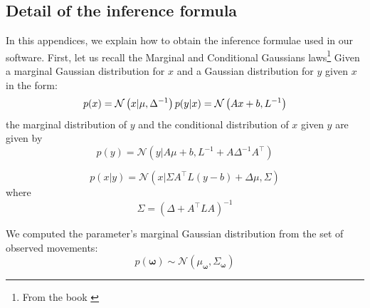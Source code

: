 \documentclass[utf8]{frontiersSCNS} %
\begin{document}





\begin{appendices}
\section{Detail of the inference formula}
\label{sec:formulas}

In this appendices, we explain how to obtain the inference formulae used in our software.
First, let us recall the Marginal and Conditional Gaussians laws\footnote{\label{noteGaussian} From the book \cite{bishop2006pattern}}
Given a marginal Gaussian distribution for $x$ and a Gaussian distribution for $y$ given $x$ in the form:
\begin{equation}
\label{eq:book1}
p(x) = \mathcal{N}\left(x | \mu, \Delta^{-1}\right)\\
p(y|x) = \mathcal{N}\left(Ax + b, L^{-1}\right)
\end{equation}
the marginal distribution of $y$ and the conditional distribution of $x$ given $y$ are given by
\begin{equation}
\label{eq:book2}
p(y) = \mathcal{N}\left(y | A\mu + b, L^{-1} + A\Delta^{-1}A^\top\right) 
\end{equation}

\begin{equation}
\label{eq:book3}
p(x | y) = \mathcal{N}\left(x | \Sigma{ A^\top L(y-b) + \Delta\mu},\Sigma\right)
\end{equation}
where
$$\Sigma = (\Delta + A^\top LA)^{-1}$$

We computed the parameter's marginal Gaussian distribution from the set of observed movements:
\begin{equation}
\label{paramdistrib}
  p(\boldsymbol{\omega}) \sim \mathcal{N}(\mu_{\boldsymbol{\omega}}, \Sigma_{\boldsymbol{\omega}})
\end{equation}


\end{appendices}
\end{document}
